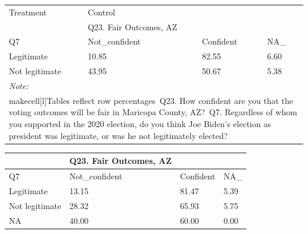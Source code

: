 \documentclass[
  11pt,
  a4paper,
]{article}
\begin{document}
\begin{table}
\centering
\centering
\begin{tabular}[t]{l|l|l|l}
\hline
\multicolumn{1}{l|}{Treatment} & \multicolumn{1}{l}{Control} \\
\cline{1-1} \cline{2-2}
 & Q23. Fair Outcomes, AZ &  & \\
\hline
Q7 & Not\_confident & Confident & NA\_\\
\hline
Legitimate & 10.85 & 82.55 & 6.60\\
\hline
Not legitimate & 43.95 & 50.67 & 5.38\\
\hline
\multicolumn{4}{l}{\rule{0pt}{1em}\textit{Note: }}\\
\multicolumn{4}{l}{\rule{0pt}{1em}makecell[l]{Tables reflect row percentages\ Q23. How confident are you that the voting outcomes will be fair in Maricopa County, AZ?\ Q7. Regardless of whom you supported in the 2020 election, do you think Joe Biden's election as president was legitimate, or was he not legitimately elected?}}\\
\end{tabular}
\centering
\begin{tabular}[t]{l|l|l|l}
\hline
 & Q23. Fair Outcomes, AZ &  & \\
\hline
Q7 & Not\_confident & Confident & NA\_\\
\hline
Legitimate & 13.15 & 81.47 & 5.39\\
\hline
Not legitimate & 28.32 & 65.93 & 5.75\\
\hline
NA & 40.00 & 60.00 & 0.00\\
\hline
\end{tabular}
\end{table}
\end{document}
